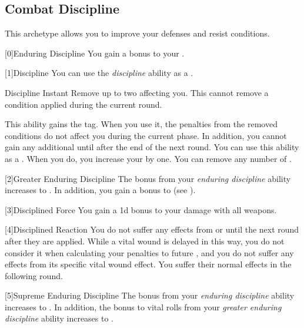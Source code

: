     \newpage
    \subsection{Combat Discipline}
        This archetype allows you to improve your defenses and resist conditions.

        [0]{Enduring Discipline} You gain a  bonus to your .

        [1]{Discipline} You can use the \textit{discipline} ability as a .
        \begin{instantability}{Discipline}
            Instant
            \rankline
            Remove up to two  affecting you.
            This cannot remove a condition applied during the current round.

            \rankline
             This ability gains the  tag.
            When you use it, the penalties from the removed conditions do not affect you during the current phase.
            In addition, you cannot gain any additional  until after the end of the next round.
             You can use this ability as a .
            When you do, you increase your  by one.
             You can remove any number of .
        \end{instantability}

        [2]{Greater Enduring Discipline}
        The bonus from your \textit{enduring discipline} ability increases to .
        In addition, you gain a  bonus to  (see ).

        [3]{Disciplined Force}
        You gain a \plus1d bonus to your damage with all weapons.

        [4]{Disciplined Reaction}
        You do not suffer any effects from  or  until the next round after they are applied.
        While a vital wound is delayed in this way, you do not consider it when calculating your penalties to future , and you do not suffer any effects from its specific vital wound effect.
        You suffer their normal effects in the following round.

        [5]{Supreme Enduring Discipline}
        The bonus from your \textit{enduring discipline} ability increases to .
        In addition, the bonus to vital rolls from your \textit{greater enduring discipline} ability increases to .

